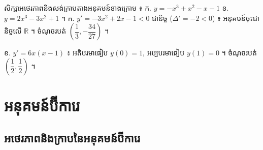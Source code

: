 \begin{center}
\end{center}

\begin{pro}
សិក្សាអថេរភាពនិងសង់ក្រាបតាងអនុគមន៍ខាងក្រោម ៖ \quad ក. $y = -x^3 + x^2 - x - 1$ \quad ខ. $y = 2x^3 - 3x^2 + 1$ ។
\ans
ក. $y' = -3x^2 + 2x - 1 < 0$ ជានិច្ច ($\Delta' = -2 < 0$) ៖ អនុគមន៍ចុះជានិច្ចលើ $\mathbb{R}$ ។ ចំណុចរបត់ $\left(\dfrac{1}{3}, -\dfrac{34}{27}\right)$ ។

ខ. $y' = 6x(x - 1)$ ៖ អតិបរមាធៀប $y(0) = 1$, អប្បបរមាធៀប $y(1) = 0$ ។ ចំណុចរបត់ $\left(\dfrac{1}{2}, \dfrac{1}{2}\right)$ ។
\end{pro}

\section{អនុគមន៍ប៊ីការេ}
\subsection{អថេរភាពនិងក្រាបនៃអនុគមន៍ប៊ីការេ}

